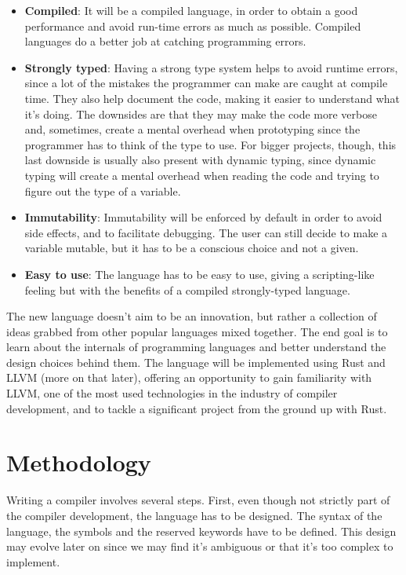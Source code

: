 ﻿\documentclass[10pt,a4paper,twocolumn,twoside]{article}
\begin{document}
\begin{itemize}
     \item \textbf{Compiled}: It will be a compiled language, in order to obtain
         a good performance and avoid run-time errors as much as possible.
         Compiled languages do a better job at catching programming errors.
     \item \textbf{Strongly typed}: Having a strong type system helps to avoid
         runtime errors, since a lot of the mistakes the programmer can make are
         caught at compile time. They also help document the code, making it
         easier to understand what it's doing. The downsides are that they may
         make the code more verbose and, sometimes, create a mental overhead
         when prototyping since the programmer has to think of the type to use.
         For bigger projects, though, this last downside is usually also present
         with dynamic typing, since dynamic typing will create a mental overhead
         when reading the code and trying to figure out the type of a variable.
     \item \textbf{Immutability}: Immutability will be enforced by default in 
         order to avoid side effects, and to facilitate debugging. The user can
         still decide to make a variable mutable, but it has to be a conscious
         choice and not a given.
    \item \textbf{Easy to use}: The language has to be easy to use, giving a 
        scripting-like feeling but with the benefits of a compiled
        strongly-typed language.
\end{itemize}

The new language doesn't aim to be an innovation, but rather a collection of
ideas grabbed from other popular languages mixed together. The end goal is to
learn about the internals of programming languages and better understand the
design choices behind them. The language will be implemented using Rust and LLVM
(more on that later), offering an opportunity to gain familiarity with LLVM, one
of the most used technologies in the industry of compiler development, and to
tackle a significant project from the ground up with Rust.

\section{Methodology}
Writing a compiler involves several steps. First, even though not strictly part
of the compiler development, the language has to be designed. The syntax of the
language, the symbols and the reserved keywords have to be defined. This design
may evolve later on since we may find it's ambiguous or that it's too complex to
implement.
\end{document}
